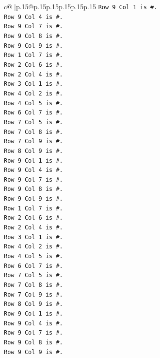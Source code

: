 \documentclass{article}
\begin{document}
{\begin{supertabular}{c@{$\;$}|p{.15\linewidth}@{}p{.15\linewidth}p{.15\linewidth}p{.15\linewidth}p{.15\linewidth}p{.15\linewidth}}
{{{\texttt{Row 9 Col 1 is \#.} \\
\texttt{Row 9 Col 4 is \#.} \\
\texttt{Row 9 Col 7 is \#.} \\
\texttt{Row 9 Col 8 is \#.} \\
\texttt{Row 9 Col 9 is \#.} \\
\texttt{Row 1 Col 7 is \#.} \\
\texttt{Row 2 Col 6 is \#.} \\
\texttt{Row 2 Col 4 is \#.} \\
\texttt{Row 3 Col 1 is \#.} \\
\texttt{Row 4 Col 2 is \#.} \\
\texttt{Row 4 Col 5 is \#.} \\
\texttt{Row 6 Col 7 is \#.} \\
\texttt{Row 7 Col 5 is \#.} \\
\texttt{Row 7 Col 8 is \#.} \\
\texttt{Row 7 Col 9 is \#.} \\
\texttt{Row 8 Col 9 is \#.} \\
\texttt{Row 9 Col 1 is \#.} \\
\texttt{Row 9 Col 4 is \#.} \\
\texttt{Row 9 Col 7 is \#.} \\
\texttt{Row 9 Col 8 is \#.} \\
\texttt{Row 9 Col 9 is \#.} \\
\texttt{Row 1 Col 7 is \#.} \\
\texttt{Row 2 Col 6 is \#.} \\
\texttt{Row 2 Col 4 is \#.} \\
\texttt{Row 3 Col 1 is \#.} \\
\texttt{Row 4 Col 2 is \#.} \\
\texttt{Row 4 Col 5 is \#.} \\
\texttt{Row 6 Col 7 is \#.} \\
\texttt{Row 7 Col 5 is \#.} \\
\texttt{Row 7 Col 8 is \#.} \\
\texttt{Row 7 Col 9 is \#.} \\
\texttt{Row 8 Col 9 is \#.} \\
\texttt{Row 9 Col 1 is \#.} \\
\texttt{Row 9 Col 4 is \#.} \\
\texttt{Row 9 Col 7 is \#.} \\
\texttt{Row 9 Col 8 is \#.} \\
\texttt{Row 9 Col 9 is \#.} \\
}}}
\end{supertabular}}
\end{document}
